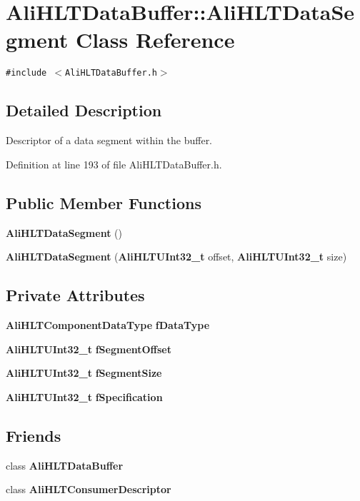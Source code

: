 \section{Ali\-HLTData\-Buffer::Ali\-HLTData\-Segment Class Reference}
\label{classAliHLTDataBuffer_1_1AliHLTDataSegment}
{\tt \#include $<$Ali\-HLTData\-Buffer.h$>$}



\subsection{Detailed Description}
Descriptor of a data segment within the buffer. 



Definition at line 193 of file Ali\-HLTData\-Buffer.h.\subsection*{Public Member Functions}
\begin{CompactItemize}
\item 
{\bf Ali\-HLTData\-Segment} ()
\item 
{\bf Ali\-HLTData\-Segment} ({\bf Ali\-HLTUInt32\_\-t} offset, {\bf Ali\-HLTUInt32\_\-t} size)
\end{CompactItemize}
\subsection*{Private Attributes}
\begin{CompactItemize}
\item 
{\bf Ali\-HLTComponent\-Data\-Type} {\bf f\-Data\-Type}
\item 
{\bf Ali\-HLTUInt32\_\-t} {\bf f\-Segment\-Offset}
\item 
{\bf Ali\-HLTUInt32\_\-t} {\bf f\-Segment\-Size}
\item 
{\bf Ali\-HLTUInt32\_\-t} {\bf f\-Specification}
\end{CompactItemize}
\subsection*{Friends}
\begin{CompactItemize}
\item 
class {\bf Ali\-HLTData\-Buffer}
\item 
class {\bf Ali\-HLTConsumer\-Descriptor}
\end{CompactItemize}


